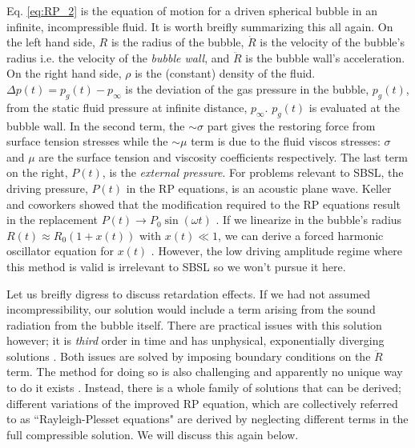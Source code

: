 \documentclass[rmp,aps,nofootinbib,superscriptaddress,floatfix,10pt]{revtex4-2}
\begin{document}
Eq. \ref{eq:RP_2} is the equation of motion for a driven spherical bubble in an infinite, incompressible fluid. It is worth breifly summarizing this all again. On the left hand side, $R$ is the radius of the bubble, $\dot{R}$ is the velocity of the bubble's radius i.e. the velocity of the \emph{bubble wall}, and $\ddot{R}$ is the bubble wall's acceleration. On the right hand side, $\rho$ is the (constant) density of the fluid. $\Delta p(t) = p_g(t)-p_\infty$ is the deviation of the gas pressure in the bubble, $p_g(t)$, from the static fluid pressure at infinite distance, $p_\infty$. $p_g(t)$ is evaluated at the bubble wall. In the second term, the $\sim \sigma$ part gives the restoring force from surface tension stresses while the $\sim \mu$ term is due to the fluid viscos stresses: $\sigma$ and $\mu$ are the surface tension and viscosity coefficients respectively. The last term on the right, $P(t)$, is the \emph{external pressure}. For problems relevant to SBSL, the driving pressure, $P(t)$ in the RP equations, is an acoustic plane wave. Keller and coworkers showed that the modification required to the RP equations result in the replacement $P(t) \rightarrow P_0 \sin(\omega t)$ \cite{keller1980bubble}. If we linearize in the bubble's radius $R(t)\approx R_0 \left( 1+x(t) \right)$ with $x(t) \ll 1$, we can derive a forced harmonic oscillator equation for $x(t)$ \cite{brennen2014cavitation,yasui2018acoustic}. However, the low driving amplitude regime where this method is valid is irrelevant to SBSL so we won't pursue it here.

Let us breifly digress to discuss retardation effects. If we had not assumed incompressibility, our solution would include a term arising from the sound radiation from the bubble itself. There are practical issues with this solution however; it is \emph{third} order in time and has unphysical, exponentially diverging solutions \cite{prosperetti1999old,brenner2002single,prosperetti1986bubble,lezzi1987bubble}. Both issues are solved by imposing boundary conditions on the $\ddot{R}$ term. The method for doing so is also challenging and apparently no unique way to do it exists \cite{prosperetti1986bubble,prosperetti1988nonlinear,keller1956damping}. Instead, there is a whole family of solutions that can be derived; different variations of the improved RP equation, which are collectively referred to as ``Rayleigh-Plesset equations" are derived by neglecting different terms in the full compressible solution. We will discuss this again below.
\end{document}
